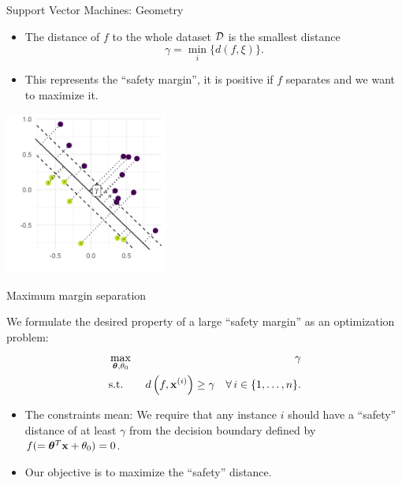 \documentclass[11pt,compress,t,notes=noshow, xcolor=table]{beamer}
\begin{document}
\begin{vbframe}{Support Vector Machines: Geometry}
\framebreak

\begin{itemize}
    \item The distance of $f$ to the whole dataset $\mathcal{D}$
    is the smallest distance
    $$
    \gamma = \min\limits_i \Big\{ d \left(f, \xi \right) \Big\}.
    $$
    \item This represents the \enquote{safety margin}, it is positive if $f$ separates and we want to maximize it.
\end{itemize}


\begin{center}
\includegraphics[width=0.4\textwidth]{figure/svm_geometry.png} \\
\end{center}


\end{vbframe}

\begin{vbframe}{Maximum margin separation}

  We formulate the desired property of a large \enquote{safety margin} as an optimization problem:
  \begin{eqnarray*}
    & \max\limits_{\bm{\theta}, \theta_0} & \gamma \\
    & \text{s.t.} & \,\, d \left(f, \mathbf{x}^{(i)} \right) \geq \gamma \quad \forall\, i \in \{1, \ldots, n\}.
    \end{eqnarray*}

    \begin{itemize}
      \item The constraints mean: We require that any instance $i$ should have a \enquote{safety} distance of at least $\gamma$ from the decision boundary defined by $f (= \bm{\theta}^T \mathbf{x} + \theta_0) = 0$.
      \item Our objective is to maximize the \enquote{safety} distance.
    \end{itemize}

\end{vbframe}
\end{document}
